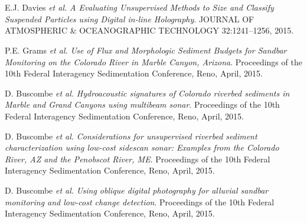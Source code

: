 \documentclass{article} %
\def\sf{\sffamily}
\def\sl{\slshape}
\newlength\sidebarwidth
\newcommand{\subtopic}[3][]
	 {\begin{minipage}{\textwidth}
	 \vspace*{.4\baselineskip}
         \nopagebreak\hspace{0in}%
         \nopagebreak\begin{minipage}[t]{\sidebarwidth - .2cm}
         \raggedleft {\sf\fontseries{sbc}\selectfont #2}
         {\\[-0.2\baselineskip] \textcolor{gray}{\footnotesize #1}}
	 \end{minipage}%
	 \hfill
	 \begin{minipage}[t]{\linewidth - \sidebarwidth}
	 #3%
	 \end{minipage}%
	 \vspace*{.2\baselineskip plus 1\baselineskip minus
	 .2\baselineskip}%
	 \end{minipage}}
\begin{document}
\subtopic{\hspace*{-3ex} 2015}{~
  \begin{itemize}[leftmargin=0ex, itemsep=0ex, parsep=.5ex, labelindent=-4ex]

    \publication
      E.J. Davies {\sl et al.}
      {\sl A Evaluating Unsupervised Methods to Size and Classify Suspended Particles using Digital in-line Holography}.
      JOURNAL OF ATMOSPHERIC \& OCEANOGRAPHIC TECHNOLOGY 32:1241--1256, 2015.

    \publication
      P.E. Grams {\sl et al.}
      {\sl Use of Flux and Morphologic Sediment Budgets for Sandbar Monitoring on the Colorado River in Marble Canyon, Arizona}.
      Proceedings of the 10th Federal Interagency Sedimentation Conference, Reno, April, 2015.

    \publication
      D. Buscombe {\sl et al.}
      {\sl Hydroacoustic signatures of Colorado riverbed sediments in Marble and Grand Canyons using multibeam sonar}.
      Proceedings of the 10th Federal Interagency Sedimentation Conference, Reno, April, 2015.

    \publication
      D. Buscombe {\sl et al.}
      {\sl Considerations for unsupervised riverbed sediment characterization using low-cost sidescan sonar: Examples from the Colorado River, AZ and the Penobscot River, ME}.
      Proceedings of the 10th Federal Interagency Sedimentation Conference, Reno, April, 2015.

    \publication
      D. Buscombe {\sl et al.}
      {\sl Using oblique digital photography for alluvial sandbar monitoring and low-cost change detection}.
      Proceedings of the 10th Federal Interagency Sedimentation Conference, Reno, April, 2015.

    \end{itemize}
}
\end{document}
